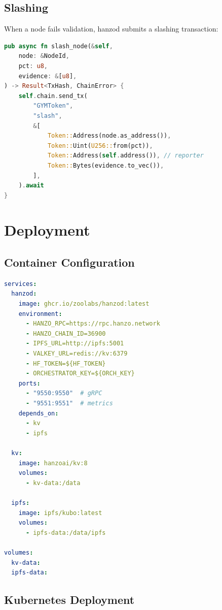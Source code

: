 \documentclass[11pt,letterpaper]{article}
\begin{document}
\subsection{Slashing}

When a node fails validation, hanzod submits a slashing transaction:

\begin{lstlisting}[language=Rust,caption=Slashing submission]
pub async fn slash_node(&self,
    node: &NodeId,
    pct: u8,
    evidence: &[u8],
) -> Result<TxHash, ChainError> {
    self.chain.send_tx(
        "GYMToken",
        "slash",
        &[
            Token::Address(node.as_address()),
            Token::Uint(U256::from(pct)),
            Token::Address(self.address()), // reporter
            Token::Bytes(evidence.to_vec()),
        ],
    ).await
}
\end{lstlisting}

\section{Deployment}
\label{sec:deployment}

\subsection{Container Configuration}

\begin{lstlisting}[language=YAML,caption=Hanzod deployment (compose.yml)]
services:
  hanzod:
    image: ghcr.io/zoolabs/hanzod:latest
    environment:
      - HANZO_RPC=https://rpc.hanzo.network
      - HANZO_CHAIN_ID=36900
      - IPFS_URL=http://ipfs:5001
      - VALKEY_URL=redis://kv:6379
      - HF_TOKEN=${HF_TOKEN}
      - ORCHESTRATOR_KEY=${ORCH_KEY}
    ports:
      - "9550:9550"  # gRPC
      - "9551:9551"  # metrics
    depends_on:
      - kv
      - ipfs

  kv:
    image: hanzoai/kv:8
    volumes:
      - kv-data:/data

  ipfs:
    image: ipfs/kubo:latest
    volumes:
      - ipfs-data:/data/ipfs

volumes:
  kv-data:
  ipfs-data:
\end{lstlisting}

\subsection{Kubernetes Deployment}
\end{document}
